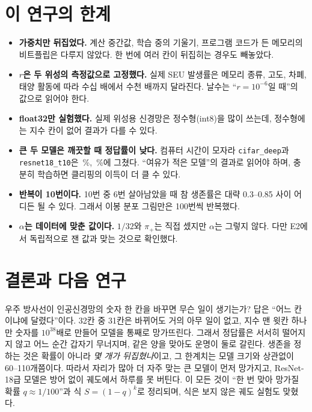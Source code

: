 \documentclass[11pt,a4paper]{article}
\newcommand{\code}[1]{\texttt{#1}}
\begin{document}
\section{이 연구의 한계}
\begin{itemize}[leftmargin=*]
  \item \textbf{가중치만 뒤집었다.} 계산 중간값, 학습 중의 기울기, 프로그램 코드가 든 메모리의 비트플립은 다루지 않았다. 한 번에 여러 칸이 뒤집히는 경우도 빼놓았다.
  \item \textbf{$r$은 두 위성의 측정값으로 고정했다.} 실제 SEU 발생률은 메모리 종류, 고도, 차폐, 태양 활동에 따라 수십 배에서 수천 배까지 달라진다. 날수는 ``$r=10^{-6}$일 때''의 값으로 읽어야 한다.
  \item \textbf{float32만 실험했다.} 실제 위성용 신경망은 정수형(int8)을 많이 쓰는데, 정수형에는 지수 칸이 없어 결과가 다를 수 있다.
  \item \textbf{큰 두 모델은 깨끗할 때 정답률이 낮다.} 컴퓨터 시간이 모자라 \code{cifar\_deep}과 \code{resnet18\_t10}은 \CleanCifar{}\,\%, \CleanResnet{}\,\%에 그쳤다. ``여유가 적은 모델''의 결과로 읽어야 하며, 충분히 학습하면 클리핑의 이득이 더 클 수 있다.
  \item \textbf{반복이 10번이다.} 10번 중 6번 살아남았을 때 참 생존률은 대략 0.3--0.85 사이 어디든 될 수 있다. 그래서 이봉 분포 그림만은 100번씩 반복했다.
  \item \textbf{$\alpha$는 데이터에 맞춘 값이다.} $1/32$와 $\pi_+$는 직접 셌지만 $\alpha$는 그렇지 않다. 다만 E2에서 독립적으로 잰 값과 맞는 것으로 확인했다.
\end{itemize}

\section{결론과 다음 연구}
우주 방사선이 인공신경망의 숫자 한 칸을 바꾸면 무슨 일이 생기는가? 답은 ``어느 칸이냐에 달렸다''이다. 32칸 중 31칸은 바뀌어도 거의 아무 일이 없고, 지수 맨 윗칸 하나만 숫자를 $10^{38}$배로 만들어 모델을 통째로 망가뜨린다. 그래서 정답률은 서서히 떨어지지 않고 어느 순간 갑자기 무너지며, 같은 양을 맞아도 운명이 둘로 갈린다. 생존을 정하는 것은 확률이 아니라 \emph{몇 개가 뒤집혔나}이고, 그 한계치는 모델 크기와 상관없이 60--110개쯤이다. 따라서 자리가 많아 더 자주 맞는 큰 모델이 먼저 망가지고, ResNet-18급 모델은 방어 없이 궤도에서 하루를 못 버틴다. 이 모든 것이 ``한 번 맞아 망가질 확률 $q\approx1/100$''과 식 $S=(1-q)^k$로 정리되며, 식은 보지 않은 궤도 실험도 맞혔다.
\end{document}
